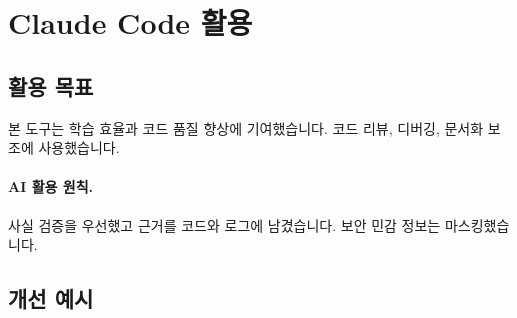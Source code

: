 \section{Claude Code 활용}

\subsection{활용 목표}
본 도구는 학습 효율과 코드 품질 향상에 기여했습니다.
코드 리뷰, 디버깅, 문서화 보조에 사용했습니다.

\paragraph{AI 활용 원칙.} 사실 검증을 우선했고 근거를 코드와 로그에 남겼습니다. 보안 민감 정보는 마스킹했습니다.

\subsection{개선 예시}
